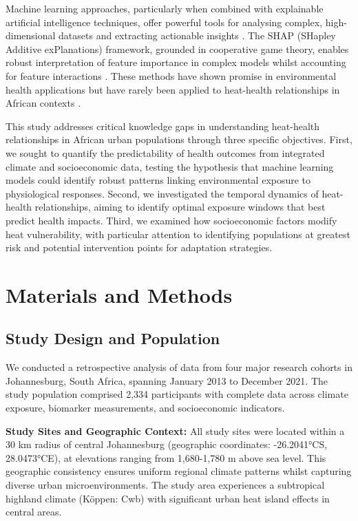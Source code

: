 \documentclass[11pt,a4paper]{article}
\newcommand{\degrees}{°C}
\begin{document}
Machine learning approaches, particularly when combined with explainable artificial intelligence techniques, offer powerful tools for analysing complex, high-dimensional datasets and extracting actionable insights \citep{Rajkomar2019, Beam2021}. The SHAP (SHapley Additive exPlanations) framework, grounded in cooperative game theory, enables robust interpretation of feature importance in complex models whilst accounting for feature interactions \citep{Lundberg2017, Lundberg2020}. These methods have shown promise in environmental health applications but have rarely been applied to heat-health relationships in African contexts \citep{Nori2019, Chen2022}.

This study addresses critical knowledge gaps in understanding heat-health relationships in African urban populations through three specific objectives. First, we sought to quantify the predictability of health outcomes from integrated climate and socioeconomic data, testing the hypothesis that machine learning models could identify robust patterns linking environmental exposure to physiological responses. Second, we investigated the temporal dynamics of heat-health relationships, aiming to identify optimal exposure windows that best predict health impacts. Third, we examined how socioeconomic factors modify heat vulnerability, with particular attention to identifying populations at greatest risk and potential intervention points for adaptation strategies.

\section{Materials and Methods}

\subsection{Study Design and Population}

We conducted a retrospective analysis of data from four major research cohorts in Johannesburg, South Africa, spanning January 2013 to December 2021. The study population comprised 2,334 participants with complete data across climate exposure, biomarker measurements, and socioeconomic indicators.

\textbf{Study Sites and Geographic Context:} All study sites were located within a 30 km radius of central Johannesburg (geographic coordinates: -26.2041\degrees S, 28.0473\degrees E), at elevations ranging from 1,680-1,780 m above sea level. This geographic consistency ensures uniform regional climate patterns whilst capturing diverse urban microenvironments. The study area experiences a subtropical highland climate (K{\"o}ppen: Cwb) with significant urban heat island effects in central areas.
\end{document}
